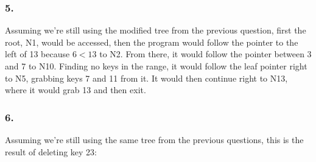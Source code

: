 \documentclass[a4paper, 12pt]{article}
\begin{document}
\subsubsection*{5.}

Assuming we're still using the modified tree from the previous question, first
the root, N1, would be accessed, then the program would follow the pointer to
the left of 13 because $6 < 13$ to N2. From there, it would follow the pointer
between 3 and 7 to N10. Finding no keys in the range, it would follow the leaf
pointer right to N5, grabbing keys 7 and 11 from it. It would then continue
right to N13, where it would grab 13 and then exit.

\subsubsection*{6.}

Assuming we're still using the same tree from the previous questions, this is
the result of deleting key 23:
\end{document}
